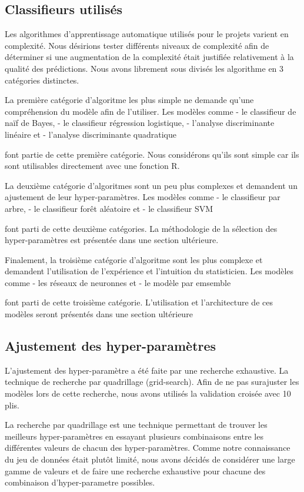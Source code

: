 \subsection{Classifieurs utilisés}

Les algorithmes d'apprentissage automatique utilisés pour le projets varient en complexité. Nous désirions tester différents niveaux de complexité afin de déterminer si une augmentation de la complexité était justifiée relativement à la qualité des prédictions. Nous avons librement sous divisés les algorithme en 3 catégories distinctes. 

La première catégorie d'algoritme les plus simple ne demande qu'une compréhension du modèle afin de l'utiliser. Les modèles comme 
- le classifieur de naïf de Bayes, 
- le classifieur régression logistique, 
- l'analyse discriminante linéaire et 
- l'analyse discriminante quadratique 

font partie de cette première catégorie. Nous considérons qu'ils sont simple car ils sont utilisables directement avec une fonction R. 

La deuxième catégorie d'algoritmes sont un peu plus complexes et demandent un ajustement de leur hyper-paramètres. Les modèles comme 
- le classifieur par arbre, 
- le classifieur forêt aléatoire et 
- le classifieur SVM 

font parti de cette deuxième catégories. La méthodologie de la sélection des hyper-paramètres est présentée dans une section ultérieure.

Finalement, la troisième catégorie d'algoritme sont les plus complexe et demandent l'utilisation de l'expérience et l'intuition du statisticien. Les modèles comme 
- les réseaux de neuronnes et 
- le modèle par emsemble 

font parti de cette troisième catégorie. L'utilisation et l'architecture de ces modèles seront présentés dans une section ultérieure

\subsection{Ajustement des hyper-paramètres}

L'ajustement des hyper-paramètre a été faite par une recherche exhaustive. La technique de recherche par quadrillage (grid-search). Afin de ne pas surajuster les modèles lors de cette recherche, nous avons utilisés la validation croisée avec 10 plis.

La recherche par quadrillage est une technique permettant de trouver les meilleurs hyper-paramètres en essayant plusieurs combinaisons entre les différentes valeurs de chacun des hyper-paramètres. Comme notre connaissance du jeu de données était plutôt limité, nous avons décidés de considérer une large gamme de valeurs et de faire une recherche exhaustive pour chacune des combinaison d'hyper-parametre possibles.


